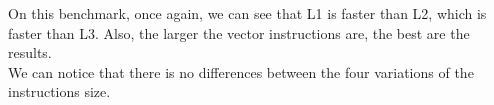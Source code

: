 
On this benchmark, once again, we can see that L1 is faster than L2, which is faster than L3. Also, the larger the vector instructions are, the best are the results.\\


We can notice that there is no differences between the four variations of the  instructions size.